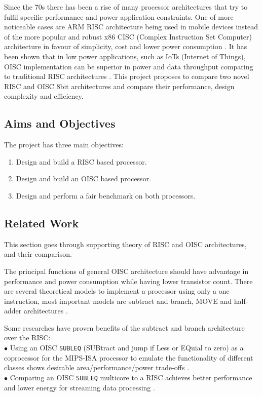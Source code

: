Since the 70s there has been a rise of many processor architectures that try to fulfil specific performance and power application constraints. One of more noticeable cases are ARM RISC architecture being used in mobile devices instead of the more popular and robust x86 CISC (Complex Instruction Set Computer) architecture in favour of simplicity, cost and lower power consumption \autocite{jamil_1995,blem_menon_sankaralingam_2013}. It has been shown that in low power applications, such as IoTs (Internet of Things), OISC implementation can be superior in power and data throughput comparing to traditional RISC architectures \autocite{yokota_saso_hara-azumi_2017, ahmed_sakamoto_anderson_hara-azumi_2015}. This project proposes to compare two novel RISC and OISC 8bit architectures and compare their performance, design complexity and efficiency.


\subsection{Aims and Objectives}

The project has three main objectives:
\begin{enumerate}
	\item Design and build a RISC based processor.
	\item Design and build an OISC based processor. 
	\item Design and perform a fair benchmark on both processors. 
\end{enumerate}

\subsection{Related Work}
\label{subsec:supporting_theory}
This section goes through supporting theory of RISC and OISC architectures, and their comparison.

The principal functions of general OISC architecture should have advantage in performance and power consumption while having lower transistor count. There are several theoretical models to implement a processor using only a one instruction, most important models are subtract and branch, MOVE and half-adder architectures \autocite{gilreath_laplante_2003}. 

Some researches have proven benefits of the subtract and branch architecture over the RISC:\\
$\bullet$ Using an OISC \texttt{SUBLEQ} (SUBtract and jump if Less or EQuial to zero) as a coprocessor for the MIPS-ISA processor to emulate the functionality of different classes shows desirable area/performance/power trade-offs \autocite{ahmed_sakamoto_anderson_hara-azumi_2015}.\\
$\bullet$ Comparing an OISC \texttt{SUBLEQ} multicore to a RISC achieves better performance and lower energy for streaming data processing \autocite{yokota_saso_hara-azumi_2017}.

